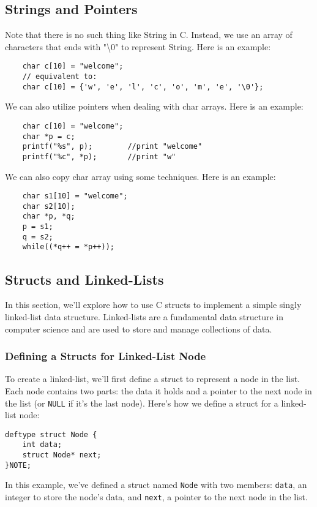 \documentclass{article}
\begin{document}
\subsection{Strings and Pointers}
Note that there is no such thing like String in C. Instead, we use an array of characters that ends with "\textbackslash0" to represent String. Here is an example:
\begin{verbatim}
    char c[10] = "welcome";
    // equivalent to:
    char c[10] = {'w', 'e', 'l', 'c', 'o', 'm', 'e', '\0'};
\end{verbatim}
We can also utilize pointers when dealing with char arrays. Here is an example:
\begin{verbatim}
    char c[10] = "welcome";
    char *p = c;
    printf("%s", p);        //print "welcome"
    printf("%c", *p);       //print "w"
\end{verbatim}
We can also copy char array using some techniques. Here is an example:
\begin{verbatim}
    char s1[10] = "welcome";
    char s2[10];
    char *p, *q;
    p = s1;
    q = s2;
    while((*q++ = *p++));
\end{verbatim}

\subsection{Structs and Linked-Lists}

In this section, we'll explore how to use C structs to implement a simple singly linked-list data structure. Linked-lists are a fundamental data structure in computer science and are used to store and manage collections of data.

\subsubsection{Defining a Structs for Linked-List Node}

To create a linked-list, we'll first define a struct to represent a node in the list. Each node contains two parts: the data it holds and a pointer to the next node in the list (or \texttt{NULL} if it's the last node). Here's how we define a struct for a linked-list node:

\begin{verbatim}
deftype struct Node {
    int data;
    struct Node* next;
}NOTE;
\end{verbatim}

In this example, we've defined a struct named \texttt{Node} with two members: \texttt{data}, an integer to store the node's data, and \texttt{next}, a pointer to the next node in the list.
\end{document}
